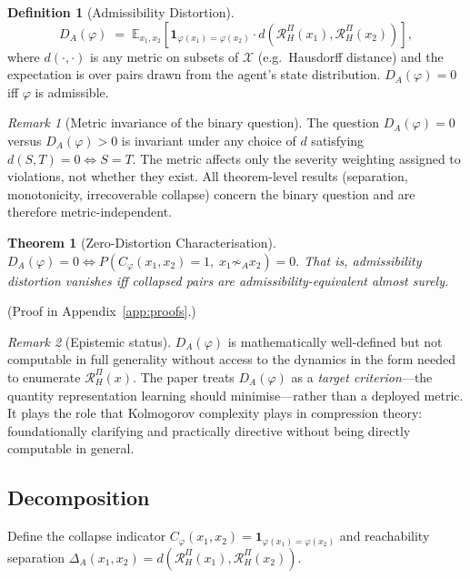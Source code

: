 \documentclass[10pt,twocolumn]{article}
\theoremstyle{plain}
\newtheorem{theorem}{Theorem}
\theoremstyle{definition}
\newtheorem{definition}{Definition}
\theoremstyle{remark}
\newtheorem{remark}{Remark}
\newcommand{\simA}{\sim_{\!A}}
\newcommand{\RHP}{\mathcal{R}_{H}^{\Pi}}
\newcommand{\DA}{D_{A}(\varphi)}
\newcommand{\calX}{\mathcal{X}}
\begin{document}
\begin{definition}[Admissibility Distortion]
\label{def:distortion}
\begin{equation}
  \DA \;=\; \mathbb{E}_{x_1,x_2}\!\left[
    \mathbf{1}_{\varphi(x_1)=\varphi(x_2)}
    \cdot d\!\left(\RHP(x_1),\RHP(x_2)\right)
  \right],
\end{equation}
where $d(\cdot,\cdot)$ is any metric on subsets of $\calX$ (e.g.\ Hausdorff
distance) and the expectation is over pairs drawn from the agent's state
distribution. $\DA=0$ iff $\varphi$ is admissible.
\end{definition}

\begin{remark}[Metric invariance of the binary question]
\label{rem:metricinv}
The question $\DA=0$ versus $\DA>0$ is invariant under any choice of $d$
satisfying $d(S,T)=0\iff S=T$. The metric affects only the severity weighting
assigned to violations, not whether they exist. All theorem-level results
(separation, monotonicity, irrecoverable collapse) concern the binary question
and are therefore metric-independent.
\end{remark}

\begin{theorem}[Zero-Distortion Characterisation]
\label{thm:char}
$\DA = 0 \iff P\!\left(C_\varphi(x_1,x_2)=1,\; x_1\not\simA x_2\right) = 0.$
That is, admissibility distortion vanishes iff collapsed pairs are
admissibility-equivalent almost surely.
\end{theorem}

\noindent(Proof in Appendix~\ref{app:proofs}.)

\begin{remark}[Epistemic status]
$\DA$ is mathematically well-defined but not computable in full generality
without access to the dynamics in the form needed to enumerate $\RHP(x)$.
The paper treats $\DA$ as a \emph{target criterion}---the quantity representation
learning should minimise---rather than a deployed metric. It plays the role that
Kolmogorov complexity plays in compression theory: foundationally clarifying and
practically directive without being directly computable in general.
\end{remark}

\subsection{Decomposition}

Define the collapse indicator $C_\varphi(x_1,x_2)=\mathbf{1}_{\varphi(x_1)=\varphi(x_2)}$
and reachability separation $\Delta_A(x_1,x_2)=d(\RHP(x_1),\RHP(x_2))$.
\end{document}
